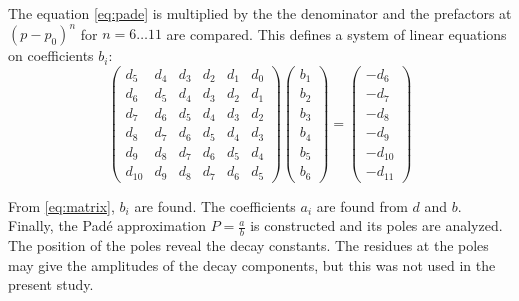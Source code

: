 The equation \ref{eq:pade} is multiplied by the the denominator and the prefactors at $(p-p_0)^{n}$ for $n=6\dots11$ are compared. This defines a system of linear equations on coefficients $b_i$:\\


\begin{equation}\label{eq:matrix}
  \begin{pmatrix}
    d_{5} & d_{4} & d_{3} & d_2 & d_1 & d_0\\
    d_6 & d_5 & d_4 & d_3 & d_2 & d_1\\
    d_7 & d_6 & d_5 & d_4 & d_3 & d_2\\
    d_8 & d_7 & d_6 & d_5 & d_4 & d_3\\
    d_9 & d_8 & d_7 & d_6 & d_5 & d_4\\
    d_{10} & d_9 & d_8 & d_7 & d_6 & d_5
  \end{pmatrix}
       \begin{pmatrix}
   b_1\\
   b_2\\
   b_3\\
   b_4\\
   b_5\\
   b_6
   \end{pmatrix}
  =
    \begin{pmatrix}
   -d_6\\
   -d_7\\
   -d_8\\
   -d_9\\
   -d_{10}\\
   -d_{11}
   \end{pmatrix}
\end{equation}

From \ref{eq:matrix}, $b_i$ are found. The coefficients $a_i$ are found from ${d}$ and ${b}$.\\

Finally, the Pad{\'e} approximation $P=\frac{a}{b}$ is constructed and its poles are analyzed. The position of the poles reveal the decay constants. The residues at the poles may give the amplitudes of the decay components, but this was not used in the present study.

